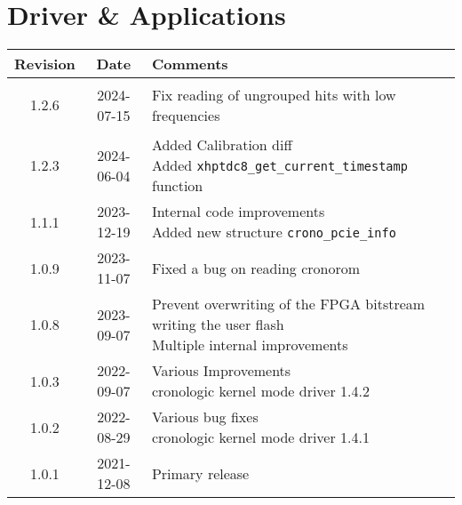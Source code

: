 \section{Driver \& Applications}
\begin{tabularx}{\textwidth}{|c|c|X|}
    \hline
    Revision & Date & Comments\\
    \hline\hline
    \hypertarget{drvrev}{1.2.6} & 2024-07-15 &
    \makecell[l]{
        Fix reading of ungrouped hits with low frequencies\\*
    }\\
    \hline
    1.2.3 & 2024-06-04 &
    \makecell[l]{
        Added Calibration diff\\*
        Added \texttt{xhptdc8\_get\_current\_timestamp} function\\*
    }\\
    \hline
    1.1.1 & 2023-12-19 &
    \makecell[l]{
        Internal code improvements\\*
        Added new structure \texttt{crono\_pcie\_info}
    }\\
    \hline
    1.0.9 & 2023-11-07 & Fixed a bug on reading cronorom   \\
    \hline
    1.0.8 & 2023-09-07 &
    \makecell[l]{
        Prevent overwriting of the FPGA bitstream writing the user flash\\*
        Multiple internal improvements
    }\\
    \hline
    1.0.3 & 2022-09-07 &
    \makecell[l]{
        Various Improvements\\*
        cronologic kernel mode driver 1.4.2
    }\\
    \hline
    1.0.2 & 2022-08-29 &
    \makecell[l]{
        Various bug fixes\\*
        cronologic kernel mode driver 1.4.1
    }\\
    \hline
    1.0.1 & 2021-12-08 & Primary release\\
    \hline
\end{tabularx}